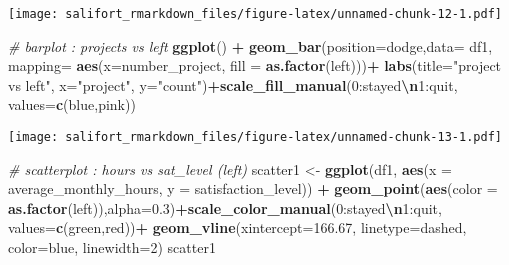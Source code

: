 \documentclass[
]{article}
\newenvironment{Shaded}{\begin{snugshade}}{\end{snugshade}}
\newcommand{\AttributeTok}[1]{\textcolor[rgb]{0.13,0.29,0.53}{#1}}
\newcommand{\CommentTok}[1]{\textcolor[rgb]{0.56,0.35,0.01}{\textit{#1}}}
\newcommand{\DecValTok}[1]{\textcolor[rgb]{0.00,0.00,0.81}{#1}}
\newcommand{\FloatTok}[1]{\textcolor[rgb]{0.00,0.00,0.81}{#1}}
\newcommand{\FunctionTok}[1]{\textcolor[rgb]{0.13,0.29,0.53}{\textbf{#1}}}
\newcommand{\NormalTok}[1]{#1}
\newcommand{\OtherTok}[1]{\textcolor[rgb]{0.56,0.35,0.01}{#1}}
\newcommand{\SpecialCharTok}[1]{\textcolor[rgb]{0.81,0.36,0.00}{\textbf{#1}}}
\newcommand{\StringTok}[1]{\textcolor[rgb]{0.31,0.60,0.02}{#1}}
\begin{document}
\texttt{[image: salifort\_rmarkdown\_files/figure-latex/unnamed-chunk-12-1.pdf]}

\begin{Shaded}
\begin{Highlighting}[]
\CommentTok{\# barplot : projects vs left}
\FunctionTok{ggplot}\NormalTok{() }\SpecialCharTok{+} \FunctionTok{geom\_bar}\NormalTok{(}\AttributeTok{position=}\StringTok{\textquotesingle{}dodge\textquotesingle{}}\NormalTok{,}\AttributeTok{data=}\NormalTok{ df1, }\AttributeTok{mapping=} \FunctionTok{aes}\NormalTok{(}\AttributeTok{x=}\NormalTok{number\_project, }\AttributeTok{fill =} \FunctionTok{as.factor}\NormalTok{(left)))}\SpecialCharTok{+}
\FunctionTok{labs}\NormalTok{(}\AttributeTok{title=}\StringTok{"project vs left"}\NormalTok{, }\AttributeTok{x=}\StringTok{"project"}\NormalTok{, }\AttributeTok{y=}\StringTok{"count"}\NormalTok{)}\SpecialCharTok{+}\FunctionTok{scale\_fill\_manual}\NormalTok{(}\StringTok{\textquotesingle{}0:stayed}\SpecialCharTok{\textbackslash{}n}\StringTok{1:quit\textquotesingle{}}\NormalTok{, }\AttributeTok{values=}\FunctionTok{c}\NormalTok{(}\StringTok{\textquotesingle{}blue\textquotesingle{}}\NormalTok{,}\StringTok{\textquotesingle{}pink\textquotesingle{}}\NormalTok{))}
\end{Highlighting}
\end{Shaded}

\texttt{[image: salifort\_rmarkdown\_files/figure-latex/unnamed-chunk-13-1.pdf]}

\begin{Shaded}
\begin{Highlighting}[]
\CommentTok{\# scatterplot : hours vs sat\_level (left)}
\NormalTok{scatter1 }\OtherTok{\textless{}{-}} \FunctionTok{ggplot}\NormalTok{(df1, }\FunctionTok{aes}\NormalTok{(}\AttributeTok{x =}\NormalTok{ average\_monthly\_hours, }\AttributeTok{y =}\NormalTok{ satisfaction\_level)) }\SpecialCharTok{+}
  \FunctionTok{geom\_point}\NormalTok{(}\FunctionTok{aes}\NormalTok{(}\AttributeTok{color =} \FunctionTok{as.factor}\NormalTok{(left)),}\AttributeTok{alpha=}\FloatTok{0.3}\NormalTok{)}\SpecialCharTok{+}\FunctionTok{scale\_color\_manual}\NormalTok{(}\StringTok{\textquotesingle{}0:stayed}\SpecialCharTok{\textbackslash{}n}\StringTok{1:quit\textquotesingle{}}\NormalTok{, }\AttributeTok{values=}\FunctionTok{c}\NormalTok{(}\StringTok{\textquotesingle{}green\textquotesingle{}}\NormalTok{,}\StringTok{\textquotesingle{}red\textquotesingle{}}\NormalTok{))}\SpecialCharTok{+}
  \FunctionTok{geom\_vline}\NormalTok{(}\AttributeTok{xintercept=}\FloatTok{166.67}\NormalTok{, }\AttributeTok{linetype=}\StringTok{\textquotesingle{}dashed\textquotesingle{}}\NormalTok{, }\AttributeTok{color=}\StringTok{\textquotesingle{}blue\textquotesingle{}}\NormalTok{, }\AttributeTok{linewidth=}\DecValTok{2}\NormalTok{)}
\NormalTok{scatter1}
\end{Highlighting}
\end{Shaded}
\end{document}
